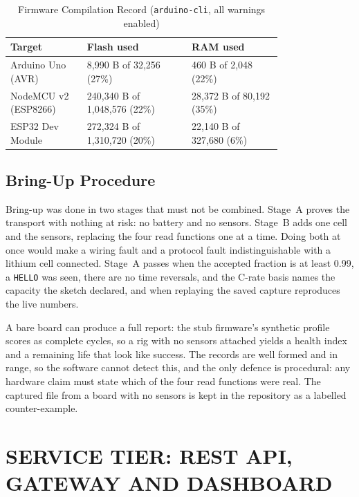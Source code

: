 \documentclass[12pt,a4paper]{amritareport}
\begin{document}
\begin{table}[htbp]
	\caption{Firmware Compilation Record (\texttt{arduino-cli}, all warnings enabled)}
	\centering
	\small
	\renewcommand{\arraystretch}{1.15}
	\setlength{\tabcolsep}{4pt}
	\begin{tabular}{|L{0.22\linewidth}|C{0.3\linewidth}|C{0.26\linewidth}|}
		\hline
		\textbf{Target} & \textbf{Flash used} & \textbf{RAM used} \\
		\hline
		Arduino Uno (AVR) & 8,990 B of 32,256 (27\%) & 460 B of 2,048 (22\%) \\
		\hline
		NodeMCU v2 (ESP8266) & 240,340 B of 1,048,576 (22\%) & 28,372 B of 80,192 (35\%) \\
		\hline
		ESP32 Dev Module & 272,324 B of 1,310,720 (20\%) & 22,140 B of 327,680 (6\%) \\
		\hline
	\end{tabular}
	\label{tab:compile}
\end{table}

\subsection{Bring-Up Procedure}

Bring-up was done in two stages that must not be combined. Stage~A proves the transport with nothing at risk: no battery and no sensors. Stage~B adds one cell and the sensors, replacing the four read functions one at a time. Doing both at once would make a wiring fault and a protocol fault indistinguishable with a lithium cell connected. Stage~A passes when the accepted fraction is at least 0.99, a \texttt{HELLO} was seen, there are no time reversals, and the C-rate basis names the capacity the sketch declared, and when replaying the saved capture reproduces the live numbers.

A bare board can produce a full report: the stub firmware's synthetic profile scores as complete cycles, so a rig with no sensors attached yields a health index and a remaining life that look like success. The records are well formed and in range, so the software cannot detect this, and the only defence is procedural: any hardware claim must state which of the four read functions were real. The captured file from a board with no sensors is kept in the repository as a labelled counter-example.

\section{SERVICE TIER: REST API, GATEWAY AND DASHBOARD}
\label{sec:impl-api}
\end{document}
